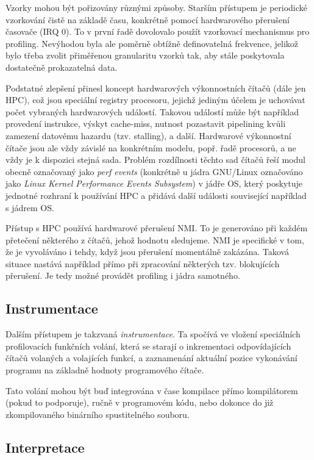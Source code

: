 \documentclass[czech,BP]{thesiskiv}
\begin{document}
Vzorky mohou být pořizovány různými způsoby. Starším přístupem je periodické vzorkování čistě na základě času, konkrétně pomocí hardwarového přerušení časovače (IRQ 0). To v první řadě dovolovalo použít vzorkovací mechanismus pro profiling. Nevýhodou byla ale poměrně obtížně definovatelná frekvence, jelikož bylo třeba zvolit přiměřenou granularitu vzorků tak, aby stále poskytovala dostatečně prokazatelná data. 

Podstatné zlepšení přinesl koncept hardwarových výkonnostních čítačů (dále jen HPC), což jsou speciální registry procesoru, jejichž jediným účelem je uchovávat počet vybraných hardwarových událostí. Takovou událostí může být například provedení instrukce, výskyt cache-miss, nutnost pozastavit pipelining kvůli zamezení datovému hazardu (tzv. stalling), a další. Hardwarové výkonnostní čítače jsou ale vždy závislé na konkrétním modelu, popř. řadě procesorů, a ne vždy je k dispozici stejná sada. Problém rozdílnosti těchto sad čítačů řeší modul obecně označovaný jako \emph{perf events} (konkrétně u jádra GNU/Linux označováno jako \emph{Linux Kernel Performance Events Subsystem}) v jádře OS, který poskytuje jednotné rozhraní k používání HPC a přidává další události související například s jádrem OS\cite{perf1}.

Přístup s HPC používá hardwarové přerušení NMI. To je generováno při každém přetečení některého z čítačů, jehož hodnotu sledujeme\cite{perf1}. NMI je specifické v tom, že je vyvoláváno i tehdy, když jsou přerušení momentálně zakázána. Taková situace nastává například přímo při zpracování některých tzv. blokujících přerušení. Je tedy možné provádět profiling i jádra samotného.

\subsection{Instrumentace}

Dalším přístupem je takzvaná \emph{instrumentace}. Ta spočívá ve vložení speciálních profilovacích funkčních volání, která se starají o inkrementaci odpovídajících čítačů volaných a volajících funkcí, a zaznamenání aktuální pozice vykonávání programu na základně hodnoty programového čítače.

Tato volání mohou být buď integrována v čase kompilace přímo kompilátorem (pokud to podporuje), ručně v programovém kódu, nebo dokonce do již zkompilovaného binárního spustitelného souboru.

\subsection{Interpretace}
\end{document}
